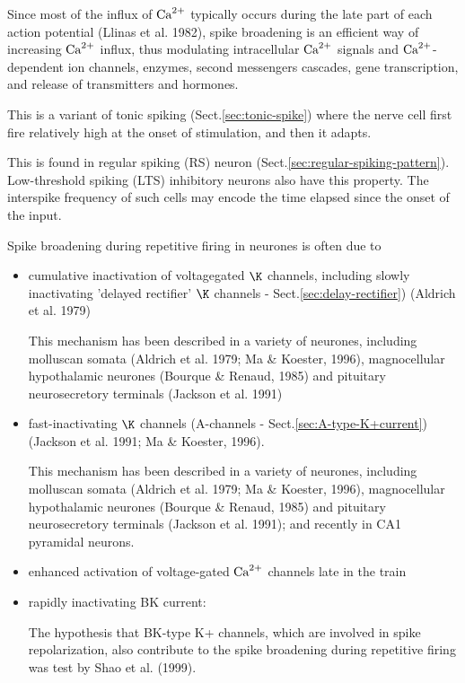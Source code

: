 Since most of the influx of ${\text{Ca}^{2+}}$ typically occurs during the late part of each
action potential (Llinas et al. 1982), spike broadening is an efficient way of
increasing ${\text{Ca}^{2+}}$ influx, thus modulating intracellular ${\text{Ca}^{2+}}$ signals and
${\text{Ca}^{2+}}$-dependent ion channels, enzymes, second messengers cascades, gene
transcription, and release of transmitters and hormones.

This is a variant of tonic spiking (Sect.\ref{sec:tonic-spike}) where 
the nerve cell first fire relatively high at the onset of stimulation, and then
it adapts.

This is found in regular spiking (RS) neuron
(Sect.\ref{sec:regular-spiking-pattern}). Low-threshold spiking (LTS) inhibitory
neurons also have this property. The interspike frequency of such cells may
encode the time elapsed since the onset of the input.

Spike broadening during repetitive firing in neurones is often due to 
\begin{itemize}
  \item  cumulative
inactivation of voltagegated $\K$ channels, including slowly inactivating
'delayed rectifier' $\K$ channels - Sect.\ref{sec:delay-rectifier}) (Aldrich et
al. 1979)

This mechanism has been described in a variety of neurones, including molluscan
somata (Aldrich et al. 1979; Ma \& Koester, 1996), magnocellular hypothalamic
neurones (Bourque \& Renaud, 1985) and pituitary neurosecretory terminals
(Jackson et al. 1991)

  \item fast-inactivating $\K$ channels (A-channels -
  Sect.\ref{sec:A-type-K+current}) (Jackson et al. 1991; Ma \& Koester, 1996).

This mechanism has been described in a variety of neurones, including molluscan
somata (Aldrich et al. 1979; Ma \& Koester, 1996), magnocellular hypothalamic
neurones (Bourque \& Renaud, 1985) and pituitary neurosecretory terminals
(Jackson et al. 1991); and recently in CA1 pyramidal neurons.
  
  \item enhanced activation of voltage-gated ${\text{Ca}^{2+}}$ channels late in the train

  \item rapidly inactivating BK current:
  
The hypothesis that  BK-type K+ channels, which are involved in spike
repolarization, also contribute to the spike broadening during repetitive firing
was test by Shao et al. (1999).

\end{itemize}

